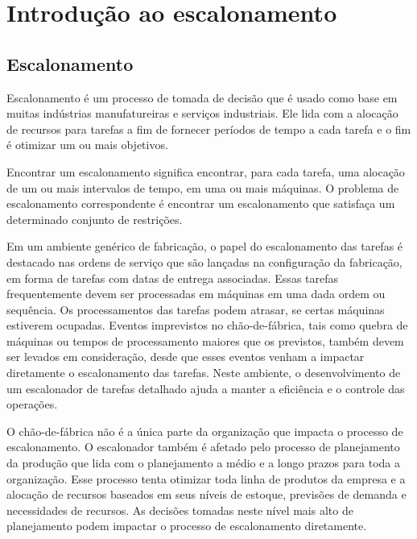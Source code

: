 \cleardoublepage
\pagestyle{fancy}


\chapter{Introdução ao escalonamento}\label{cap2}

\section{Escalonamento}\label{cap2:escalonamento}

Escalonamento é um processo de tomada de decisão que é usado como base em muitas indústrias manufatureiras e serviços industriais. Ele lida com a alocação de recursos para tarefas a fim de fornecer períodos de tempo a cada tarefa  e o fim é otimizar um ou mais objetivos.

Encontrar um escalonamento significa encontrar, para cada tarefa, uma alocação de um ou mais intervalos de tempo, em uma ou mais máquinas. O problema de escalonamento correspondente é encontrar um escalonamento que satisfaça um determinado conjunto de restrições.

Em um ambiente genérico de fabricação, o papel do escalonamento das tarefas é 
destacado nas ordens de serviço que são lançadas na configuração da fabricação,
em forma de tarefas com datas de entrega associadas. Essas tarefas 
frequentemente devem ser processadas em máquinas em uma dada ordem ou 
sequência. Os processamentos das tarefas podem atrasar, se certas máquinas 
estiverem ocupadas. Eventos imprevistos no chão-de-fábrica, tais como quebra de 
máquinas ou tempos de processamento maiores que os previstos, também devem 
ser levados em consideração, desde que esses eventos venham a impactar 
diretamente o escalonamento das tarefas. Neste ambiente, o desenvolvimento de um escalonador de tarefas detalhado ajuda a manter a eficiência e o controle das 
operações. 

O chão-de-fábrica não é a única parte da organização que impacta o 
processo de escalonamento. O escalonador também é afetado pelo processo de 
planejamento da produção que lida com o planejamento a médio e a longo prazos 
para toda a organização. Esse processo tenta otimizar toda linha de produtos da 
empresa e a alocação de recursos baseados em seus níveis de estoque, previsões 
de demanda e necessidades de recursos. As decisões tomadas neste nível mais alto 
de planejamento podem impactar o processo de escalonamento diretamente. 

